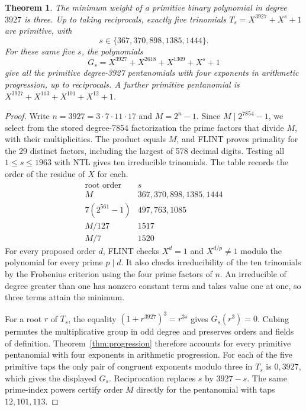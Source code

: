 \documentclass[11pt]{article}
\newtheorem{theorem}{Theorem}
\begin{document}
\begin{theorem}
The minimum weight of a primitive binary polynomial in degree
\(3927\) is three. Up to taking reciprocals, exactly five trinomials
\(T_s=X^{3927}+X^s+1\) are primitive, with
\[
                 s\in\{367,370,898,1385,1444\}.
\]
For these same five \(s\), the polynomials
\[
         G_s=X^{3927}+X^{2618}+X^{1309}+X^s+1
\]
give all the primitive degree-3927 pentanomials with four exponents
in arithmetic progression, up to reciprocals. A further primitive
pentanomial is \(X^{3927}+X^{113}+X^{101}+X^{12}+1\).
\end{theorem}
\begin{proof}
Write \(n=3927=3\cdot7\cdot11\cdot17\) and \(M=2^n-1\). Since
\(M\mid2^{7854}-1\), we select from the stored degree-7854 factorization
the prime factors that divide \(M\), with their multiplicities.
The product equals \(M\), and FLINT proves primality for the 29 distinct
factors, including the largest of 578 decimal digits.
Testing all \(1\le s\le1963\) with NTL gives ten irreducible trinomials.
The table records the order of the residue of \(X\) for each.
\[
\begin{array}{r|l}
 \text{root order} & s\\ \hline
 M                  & 367,370,898,1385,1444\\
 7(2^{561}-1)       & 497,763,1085\\
 M/127              & 1517\\
 M/7                & 1520
\end{array}
\]
For every proposed order \(d\), FLINT checks \(X^d=1\) and
\(X^{d/p}\ne1\) modulo the polynomial for every prime \(p\mid d\).
It also checks irreducibility of the ten trinomials by the Frobenius
criterion using the four prime factors of \(n\). An irreducible of
degree greater than one has nonzero constant term and takes value one
at one, so three terms attain the minimum.

For a root \(r\) of \(T_s\), the equality
\((1+r^{3927})^3=r^{3s}\) gives \(G_s(r^3)=0\).
Cubing permutes the multiplicative group in odd degree and preserves
orders and fields of definition. Theorem~\ref{thm:progression}
therefore accounts for every primitive pentanomial with four exponents
in arithmetic progression. For each of the five primitive taps the
only pair of congruent exponents modulo three in \(T_s\) is
\(0,3927\), which gives the displayed \(G_s\). Reciprocation replaces
\(s\) by \(3927-s\).
The same prime-index powers certify order \(M\) directly for the
pentanomial with taps \(12,101,113\).
\end{proof}
\end{document}
